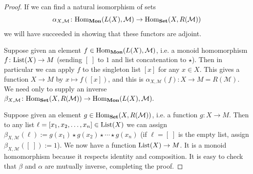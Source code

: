 \documentclass{book}
\def\tn{\textnormal}
\def\mc{\mathcal}
\def\Hom{\tn{Hom}}
\def\List{\tn{List}}
\def\to{\rightarrow}
\def\taking{\colon}
\def\Mon{{\bf Mon}}
\def\Set{{\bf Set}}
\def\mcM{\mc{M}}
\theoremstyle{remark}
\theoremstyle{definition}
\begin{document}
\begin{proof}

If we can find a natural isomorphism of sets 
$$\alpha_{X,\mcM}\taking\Hom_\Mon(L(X),\mcM)\to\Hom_\Set(X,R(\mcM))$$
we will have succeeded in showing that these functors are adjoint.

Suppose given an element $f\in\Hom_\Mon(L(X),\mcM)$, i.e. a monoid homomorphism $f\taking\List(X)\to M$ (sending $[\;]$ to $1$ and list concatenation to $\star$). Then in particular we can apply $f$ to the singleton list $[x]$ for any $x\in X$. This gives a function $X\to M$ by $x\mapsto f([x])$, and this is $\alpha_{X,\mcM}(f)\taking X\to M=R(\mcM)$. We need only to supply an inverse $\beta_{X,\mcM}\taking\Hom_\Set(X,R(\mcM))\to\Hom_\Mon(L(X),\mcM).$

Suppose given an element $g\in\Hom_\Set(X,R(\mcM))$, i.e. a function $g\taking X\to M$. Then to any list $\ell=[x_1,x_2,\ldots,x_n]\in\List(X)$ we can assign $\beta_{X,\mcM}(\ell):=g(x_1)\star g(x_2)\star\cdots\star g(x_n)$ (if $\ell=[\;]$ is the empty list, assign $\beta_{X,\mcM}([\;]):=1$). We now have a function $\List(X)\to M$. It is a monoid homomorphism because it respects identity and composition. It is easy to check that $\beta$ and $\alpha$ are mutually inverse, completing the proof.

\end{proof}
\end{document}
